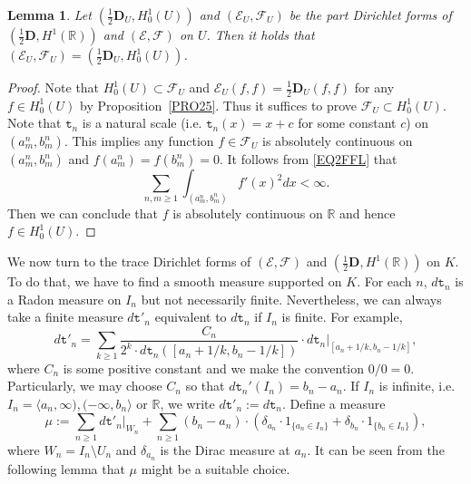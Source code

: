 \documentclass[a4paper]{amsart}
\newtheorem{lemma}[theorem]{Lemma}
\theoremstyle{definition}
\theoremstyle{remark}
\numberwithin{equation}{section}
\begin{document}
\begin{lemma}\label{LM34}
Let $(\frac{1}{2}\mathbf{D}_U, H^1_0(U))$ and $({{\mathcal{E}}}_U,{{\mathcal{F}}}_U)$ be the part Dirichlet forms of $(\frac{1}{2}\mathbf{D}, H^1(\mathbb{R}))$  and $({{\mathcal{E}}},{{\mathcal{F}}})$ on $U$. Then it holds that $({{\mathcal{E}}}_U,{{\mathcal{F}}}_U)=(\frac{1}{2}\mathbf{D}_U, H^1_0(U))$.
\end{lemma}

\begin{proof}
Note that $H^1_0(U)\subset {{\mathcal{F}}}_U$ and ${{\mathcal{E}}}_U(f,f)=\frac{1}{2}\mathbf{D}_U(f,f)$ for any $f\in H^1_0(U)$ by Proposition~\ref{PRO25}. Thus it suffices to prove ${{\mathcal{F}}}_U\subset H^1_0(U)$. Note that ${{\mathtt{t}}}_n$ is a natural scale (i.e. ${{\mathtt{t}}}_n(x)=x+c$ for some constant $c$) on $(a^n_m,b^n_m)$. This implies any function $f\in {{\mathcal{F}}}_U$ is absolutely continuous on $(a^n_m,b^n_m)$ and $f(a^n_m)=f(b^n_m)=0$. It follows from \eqref{EQ2FFL} that
\[
\sum_{n,m\geq 1} \int_{(a^n_m,b^n_m)} f'(x)^2dx<\infty.
\]
Then we can conclude that $f$ is absolutely continuous on $\mathbb{R}$ and hence $f\in H^1_0(U)$.
\end{proof}

We now turn to the trace Dirichlet forms of $({{\mathcal{E}}},{{\mathcal{F}}})$ and $(\frac{1}{2}\mathbf{D},H^1(\mathbb{R}))$ on $K$. To do that, we have to find a smooth measure supported on $K$.
For each $n$, $d{{\mathtt{t}}}_n$ is a Radon measure on $I_n$ but not necessarily finite. Nevertheless, we can always take a finite measure $d{{\mathtt{t}}}'_n$ equivalent to $d{{\mathtt{t}}}_n$ if $I_n$ is finite. For example,
\[
d{{\mathtt{t}}}'_n= \sum_{k\geq 1} \frac{C_n}{2^k\cdot d{{\mathtt{t}}}_n\left([a_n+1/k, b_n-1/k]\right)}\cdot d{{\mathtt{t}}}_n|_{[a_n+1/k, b_n-1/k]},
\]
where $C_n$ is some positive constant and we make the convention $0/0=0$. Particularly, we may choose $C_n$ so that $d{{\mathtt{t}}}_n'(I_n)=b_n-a_n$. If $I_n$ is infinite, i.e. $I_n=\langle a_n,\infty), (-\infty, b_n\rangle $ or $\mathbb{R}$, we write $d{{\mathtt{t}}}'_n:=d{{\mathtt{t}}}_n$. Define  a measure
\begin{equation}\label{EQ3MNT}
\mu:=\sum_{n\geq 1}d{{\mathtt{t}}}'_n|_{W_n} +\sum_{n\geq 1} (b_n-a_n)\cdot \left(\delta_{a_n}\cdot 1_{\{a_n\in I_n\}}+\delta_{b_n}\cdot 1_{\{b_n\in I_n\}}\right),
\end{equation}
where $W_n=I_n\setminus U_n$ and $\delta_{a_n}$ is the Dirac measure at $a_n$.
It can be seen from the following lemma that $\mu$ might be a suitable choice.
\end{document}
